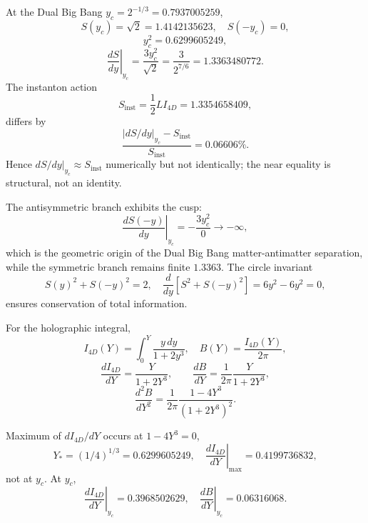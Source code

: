 \documentclass[a4paper,1pt,oneside,openany]{book}
\begin{document}
At the Dual Big Bang $y_c=2^{-1/3}=0.7937005259$,
\begin{equation}
S(y_c)=\sqrt2=1.4142135623,\quad S(-y_c)=0,
\end{equation}
\begin{equation}
y_c^2 =0.6299605249,
\end{equation}
\begin{equation}
\left.\frac{dS}{dy}\right|_{y_c}= \frac{3y_c^2}{\sqrt2}= \frac{3}{2^{7/6}}=1.3363480772.
\label{eq:dSdy-yc}
\end{equation}
The instanton action
\begin{equation}
S_{\mathrm{inst}}=\frac12 L I_{4D}=1.3354658409,
\end{equation}
differs by
\begin{equation}
\frac{|dS/dy|_{y_c}-S_{\mathrm{inst}}}{S_{\mathrm{inst}}}=0.06606\%.
\label{eq:diff-Sinst}
\end{equation}
Hence $dS/dy|_{y_c}\approx S_{\mathrm{inst}}$ numerically but not identically;
the near equality is structural, not an identity.

The antisymmetric branch exhibits the cusp:
\begin{equation}
\boxed{\left.\frac{dS(-y)}{dy}\right|_{y_c}= -\frac{3y_c^2}{0}\to -\infty},
\label{eq:cusp}
\end{equation}
which is the geometric origin of the Dual Big Bang
matter-antimatter separation, while the symmetric branch remains
finite $1.3363$. The circle invariant
\begin{equation}
S(y)^2+S(-y)^2=2,\quad \frac{d}{dy}[S^2+S(-y)^2]=6y^2-6y^2=0,
\end{equation}
ensures conservation of total information.

For the holographic integral,
\begin{equation}
I_{4D}(Y)=\int_0^Y\frac{y\,dy}{1+2y^3},\quad B(Y)=\frac{I_{4D}(Y)}{2\pi},
\end{equation}
\begin{equation}
\boxed{\frac{dI_{4D}}{dY}= \frac{Y}{1+2Y^3}},\qquad
\boxed{\frac{dB}{dY}= \frac{1}{2\pi}\frac{Y}{1+2Y^3}},
\label{eq:dBdy}
\end{equation}
\begin{equation}
\boxed{\frac{d^2B}{dY^2}= \frac{1}{2\pi}\frac{1-4Y^3}{(1+2Y^3)^2}}.
\label{eq:d2Bdy2}
\end{equation}

Maximum of $dI_{4D}/dY$ occurs at $1-4Y^3=0$,
\begin{equation}
Y_*=(1/4)^{1/3}=0.6299605249,\quad \left.\frac{dI_{4D}}{dY}\right|_{\max}=0.4199736832,
\end{equation}
not at $y_c$. At $y_c$,
\begin{equation}
\left.\frac{dI_{4D}}{dY}\right|_{y_c}=0.3968502629,\quad
\left.\frac{dB}{dY}\right|_{y_c}=0.06316068.
\end{equation}
\end{document}
